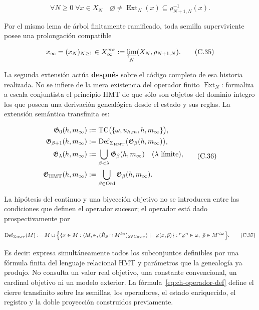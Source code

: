 \[
 \forall N\ge0\;\forall x\in X_N\quad
 \varnothing\ne\operatorname{Ext}_N(x)
 \subseteq\rho_{N+1,N}^{-1}(x).
\tag{C.34}\label{eq:ch-extension-no-vacia}
\]

Por el mismo lema de árbol finitamente ramificado, toda semilla superviviente
posee una prolongación compatible

\[
 x_\infty=(x_N)_{N\ge1}\in
 X_\infty^{\rm enr}:=\varprojlim_N(X_N,\rho_{N+1,N}).
\tag{C.35}\label{eq:ch-limite-inverso}
\]

La segunda extensión actúa \textbf{después} sobre el código completo de esa
historia realizada.
No se infiere de la mera existencia del operador finito
\(\operatorname{Ext}_N\): formaliza a escala conjuntista el principio HMT de
que sólo son objetos del dominio íntegro los que poseen una derivación
genealógica desde el estado y sus reglas. La extensión semántica transfinita
es:

\[
 \begin{aligned}
  \mathfrak G_0(h,m_\infty)
  &:=\operatorname{TC}\bigl(\{\omega,u_{h,m},h,m_\infty\}\bigr),\\
  \mathfrak G_{\beta+1}(h,m_\infty)
  &:=\operatorname{Def}_{\Sigma_{\rm HMT}}
       \bigl(\mathfrak G_\beta(h,m_\infty)\bigr),\\
  \mathfrak G_\lambda(h,m_\infty)
  &:=\bigcup_{\beta<\lambda}\mathfrak G_\beta(h,m_\infty)
       \quad(\lambda\text{ límite}),\\
  \mathfrak G_{\rm HMT}(h,m_\infty)
  &:=\bigcup_{\beta\in\operatorname{Ord}}
       \mathfrak G_\beta(h,m_\infty).
 \end{aligned}
\tag{C.36}\label{eq:ch-clausura-transfinita}
\]

La hipótesis del continuo y una biyección objetivo no se introducen entre las
condiciones que definen el operador sucesor; el operador está dado
prospectivamente por

\[
 \operatorname{Def}_{\Sigma_{\rm HMT}}(M)
 :=M\cup
 \Bigl\{
   \{x\in M:\langle M,\in,
       (\dot R_S\cap M^{k_S})_{S\in\Sigma_{\rm HMT}}\rangle
       \models\varphi(x,\bar p)\}:
   \ulcorner\varphi\urcorner\in\omega,
   \ \bar p\in M^{<\omega}
 \Bigr\}.
\tag{C.37}\label{eq:ch-operador-def}
\]

Es decir: expresa simultáneamente todos los subconjuntos definibles por una
fórmula finita del lenguaje relacional HMT y parámetros que la genealogía ya
produjo. No
consulta un valor real objetivo, una constante convencional, un cardinal
objetivo ni un modelo exterior. La fórmula~\eqref{eq:ch-operador-def} define el cierre transfinito
sobre las semillas, los operadores, el estado enriquecido, el registro y la
doble proyección construidos previamente.

